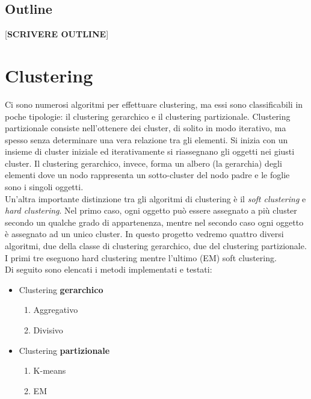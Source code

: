 \documentclass{llncs}
\newcommand{\acapo}{\vspace{0.5\baselineskip}\\}
\begin{document}
	\subsection{Outline}
	[\textbf{SCRIVERE OUTLINE}]
	\section{Clustering}
	Ci sono numerosi algoritmi per effettuare clustering, ma essi sono classificabili in poche tipologie: il clustering gerarchico e il clustering partizionale.
	Clustering partizionale consiste nell'ottenere dei cluster, di solito in modo iterativo, ma spesso senza determinare una vera relazione tra gli elementi. Si inizia con un insieme di cluster iniziale ed iterativamente
	si riassegnano gli oggetti nei giusti cluster. Il clustering gerarchico, invece, forma un albero (la gerarchia) degli elementi dove un nodo rappresenta un sotto-cluster del nodo padre e le foglie sono i singoli
	oggetti.
	\acapo
	Un'altra importante distinzione tra gli algoritmi di clustering è il \textit{soft clustering} e \textit{hard clustering}. Nel primo caso, ogni oggetto può essere assegnato a più cluster secondo un qualche
	grado di appartenenza, mentre nel secondo caso ogni oggetto è assegnato ad un unico cluster. In questo progetto vedremo quattro diversi algoritmi, due della classe di clustering gerarchico, due del clustering partizionale.
	I primi tre eseguono hard clustering mentre l'ultimo (EM) soft clustering.
	\acapo
	Di seguito sono elencati i metodi implementati e testati:
	\begin{itemize}
		\item Clustering \textbf{gerarchico}
		\begin{enumerate}
			\item Aggregativo
			\item Divisivo
		\end{enumerate}

		\item Clustering \textbf{partizionale}
		\begin{enumerate}
			\item K-means
			\item EM
		\end{enumerate}
	\end{itemize}
	
\end{document}
